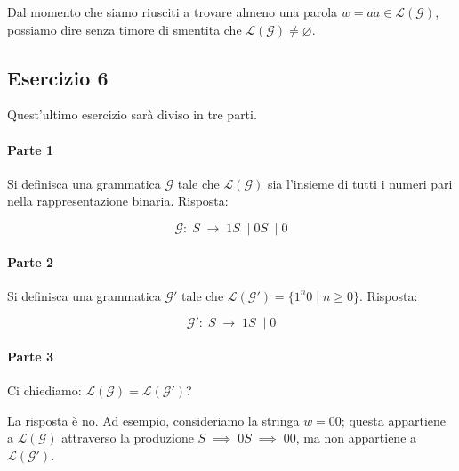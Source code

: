 \documentclass[class=book, crop=false, oneside, 12pt]{standalone}
\begin{document}
\noindent Dal momento che siamo riusciti a trovare almeno una parola \(w = aa \in \mathcal{L(G)}\), possiamo dire senza timore di smentita che \(\mathcal{L(G)} \neq \varnothing\).

\subsection*{Esercizio 6}
Quest'ultimo esercizio sarà diviso in tre parti.

\paragraph{Parte 1}
Si definisca una grammatica \(\mathcal{G}\) tale che \(\mathcal{L(G)}\) sia l'insieme di tutti i numeri pari nella rappresentazione binaria. Risposta:

\begin{equation*}
  \mathcal{G}:\; S \; \to\; 1S\; \mid 0S\; \mid 0
\end{equation*}

\paragraph{Parte 2}
Si definisca una grammatica \(\mathcal{G'}\) tale che \(\mathcal{L(G')} = \{ 1^n0 \mid n \geq 0 \}\). Risposta:

\begin{equation*}
  \mathcal{G'}:\; S\; \to\; 1S\; \mid 0
\end{equation*}

\paragraph{Parte 3}
Ci chiediamo: \(\mathcal{L(G)} = \mathcal{L(G')}\)?

La risposta è no. Ad esempio, consideriamo la stringa \(w = 00\); 
questa appartiene a \(\mathcal{L(G)}\) attraverso la produzione \(S\; \implies\; 0S\; \implies\; 00 \), ma non appartiene a \(\mathcal{L(G')}\).
\end{document}
